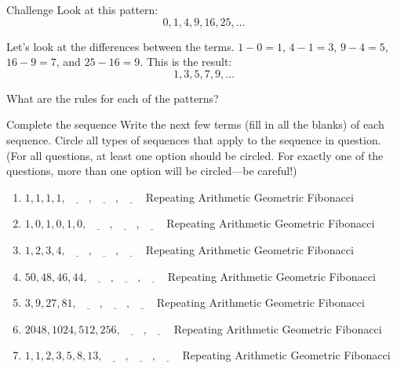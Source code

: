 \documentclass[12pt,letterpaper]{article}
\begin{document}
\begin{problem}{Challenge}
 Look at this pattern:
 \[
  0, 1, 4, 9, 16, 25, \ldots
 \]

 Let's look at the differences between the terms. $1-0=1$, $4-1=3$, $9-4=5$,
 $16-9=7$, and $25-16=9$. This is the result:
 \[
  1, 3, 5, 7, 9, \ldots
 \]

 What are the rules for each of the patterns?
\end{problem}

\begin{problem}{Complete the sequence}
 Write the next few terms (fill in all the blanks) of each sequence. Circle all
 types of sequences that apply to the sequence in question. (For all questions,
 at least one option should be circled. For exactly one of the questions, more
 than one option will be circled---be careful!)

 \begin{enumerate}
  \item $1, 1, 1, 1, \underline{\hspace{2em}}, \underline{\hspace{2em}},
  \underline{\hspace{2em}}$
  \hfill Repeating Arithmetic Geometric Fibonacci
  \item $1, 0, 1, 0, 1, 0, \underline{\hspace{2em}}, \underline{\hspace{2em}},
  \underline{\hspace{2em}}$
  \hfill Repeating Arithmetic Geometric Fibonacci
  \item $1, 2, 3, 4, \underline{\hspace{2em}}, \underline{\hspace{2em}},
  \underline{\hspace{2em}}$
  \hfill Repeating Arithmetic Geometric Fibonacci
  \item $50, 48, 46, 44, \underline{\hspace{2em}}, \underline{\hspace{2em}},
  \underline{\hspace{2em}}$
  \hfill Repeating Arithmetic Geometric Fibonacci
  \item $3, 9, 27, 81, \underline{\hspace{2em}}, \underline{\hspace{2em}},
  \underline{\hspace{2em}}$
  \hfill Repeating Arithmetic Geometric Fibonacci
  \item $2048, 1024, 512, 256, \underline{\hspace{2em}},
  \underline{\hspace{2em}}$
  \hfill Repeating Arithmetic Geometric Fibonacci
  \item $1, 1, 2, 3, 5, 8, 13, \underline{\hspace{2em}},
  \underline{\hspace{2em}}, \underline{\hspace{2em}}$
  \hfill Repeating Arithmetic Geometric Fibonacci
 \end{enumerate}
\end{problem}
\end{document}
